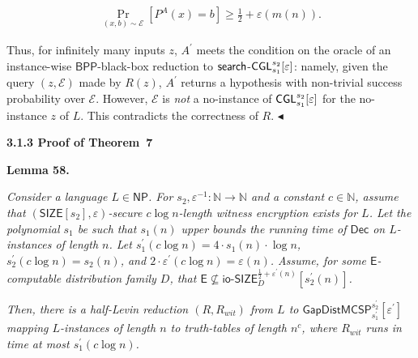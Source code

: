 \[\begin{gathered}
\Pr_{(x,b)\sim\mathcal{E}}[P^{A}(x)=b]\geq\frac{1}{2}+\varepsilon(m(n)).
\end{gathered}\]


Thus, for infinitely many inputs $z$, $A^{\prime}$ meets the condition on the oracle of an instance-wise ${\mathsf{BPP}}$-black-box reduction to ${\sf search}$-${\sf CGL}^{s_{2}}_{s_{1}}[\varepsilon]$: namely, given the query $(z,\mathcal{E})$ made by $R(z)$, $A^{\prime}$ returns a hypothesis with non-trivial success probability over $\mathcal{E}$. However, $\mathcal{E}$ is \emph{not} a no-instance of ${\sf CGL}_{s_{1}}^{s_{2}}[\varepsilon]$ for the no-instance $z$ of $L$. This contradicts the correctness of $R$.
$\blacktriangleleft$\par






\par\medskip\noindent\textbf{
3.1.3 Proof of Theorem 7
}\par





\par\medskip\noindent\textbf{
\textbf{Lemma 58}\textbf{.}
}\par



\emph{Consider a language $L\in{\mathsf{NP}}$. For $s_{2},\varepsilon^{-1}:\mathbb{N}\to\mathbb{N}$ and a constant $c\in\mathbb{N}$, assume that $({\mathsf{SIZE}}[s_{2}],\varepsilon)$-secure $c\log n$-length witness encryption exists for $L$. Let the polynomial $s_{1}$ be such that $s_{1}(n)$ upper bounds the running time of ${\mathsf{Dec}}$ on $L$-instances of length $n$. Let $s_{1}^{\prime}(c\log n)=4\cdot s_{1}(n)\cdot\log n$, $s_{2}^{\prime}(c\log n)=s_{2}(n)$, and $2\cdot\varepsilon^{\prime}(c\log n)=\varepsilon(n)$. Assume, for some ${\mathsf{E}}$-computable distribution family $D$, that ${\mathsf{E}}\nsubseteq{\mathsf{io\text{-}}}{\mathsf{SIZE}}_{D}^{\frac{1}{2}+\varepsilon^{\prime}(n)}[s_{2}^{\prime}(n)]$.}\par




\emph{Then, there is a half-Levin reduction $(R,R_{wit})$ from $L$ to ${\mathsf{GapDistMCSP}}_{s_{1}^{\prime}}^{s_{2}^{\prime}}[\varepsilon^{\prime}]$ mapping $L$-instances of length $n$ to truth-tables of length $n^{c}$, where $R_{wit}$ runs in time at most $s_{1}^{\prime}(c\log n)$.}\par



